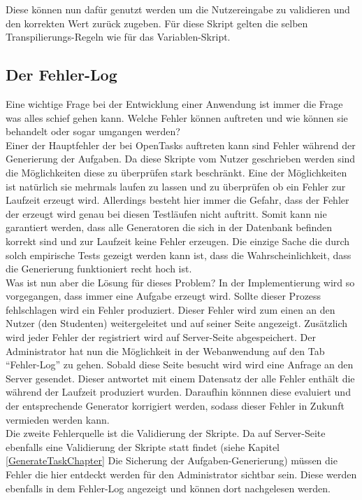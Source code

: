 Diese können nun dafür genutzt werden um die Nutzereingabe zu validieren und den korrekten Wert zurück zugeben. Für diese Skript gelten die selben Transpilierungs-Regeln wie für das Variablen-Skript.


\subsection{Der Fehler-Log}

Eine wichtige Frage bei der Entwicklung einer Anwendung ist immer die Frage was alles schief gehen kann. Welche Fehler können auftreten und wie können sie behandelt oder sogar umgangen werden? \\
Einer der Hauptfehler der bei OpenTasks auftreten kann sind Fehler während der Generierung der Aufgaben. Da diese Skripte vom Nutzer geschrieben werden sind die Möglichkeiten diese zu überprüfen stark beschränkt. Eine der Möglichkeiten ist natürlich sie mehrmals laufen zu lassen und zu überprüfen ob ein Fehler zur Laufzeit erzeugt wird. Allerdings besteht hier immer die Gefahr, dass der Fehler der erzeugt wird genau bei diesen Testläufen nicht auftritt. Somit kann nie garantiert werden, dass alle Generatoren die sich in der Datenbank befinden korrekt sind und zur Laufzeit keine Fehler erzeugen. Die einzige Sache die durch solch empirische Tests gezeigt werden kann ist, dass die Wahrscheinlichkeit, dass die Generierung funktioniert recht hoch ist. \\

Was ist nun aber die Lösung für dieses Problem? In der Implementierung wird so vorgegangen, dass immer eine Aufgabe erzeugt wird. Sollte dieser Prozess fehlschlagen wird ein Fehler produziert. Dieser Fehler wird zum einen an den Nutzer (den Studenten) weitergeleitet und auf seiner Seite angezeigt. Zusätzlich wird jeder Fehler der registriert wird auf Server-Seite abgespeichert. Der Administrator hat nun die Möglichkeit in der Webanwendung auf den Tab ``Fehler-Log'' zu gehen. Sobald diese Seite besucht wird wird eine Anfrage an den Server gesendet. Dieser antwortet mit einem Datensatz der alle Fehler enthält die während der Laufzeit produziert wurden. Daraufhin könnnen diese evaluiert und der entsprechende Generator korrigiert werden, sodass dieser Fehler in Zukunft vermieden werden kann. \\

Die zweite Fehlerquelle ist die Validierung der Skripte. Da auf Server-Seite ebenfalls eine Validierung der Skripte statt findet (siehe Kapitel \ref{GenerateTaskChapter} Die Sicherung der Aufgaben-Generierung) müssen die Fehler die hier entdeckt werden für den Administrator sichtbar sein. Diese werden ebenfalls in dem Fehler-Log angezeigt und können dort nachgelesen werden.

